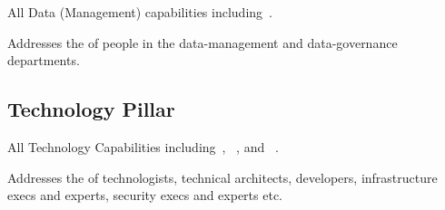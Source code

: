 All Data (Management) capabilities including~.

Addresses the  of people in the data-management and data-governance departments.

\subsection{Technology Pillar}\label{subsec:ekg-maturity-the-four-pillars-technology-pillar}

All Technology Capabilities including~,
~, and
~.

Addresses the  of technologists, technical architects, developers, infrastructure execs and experts,
security execs and experts etc.


